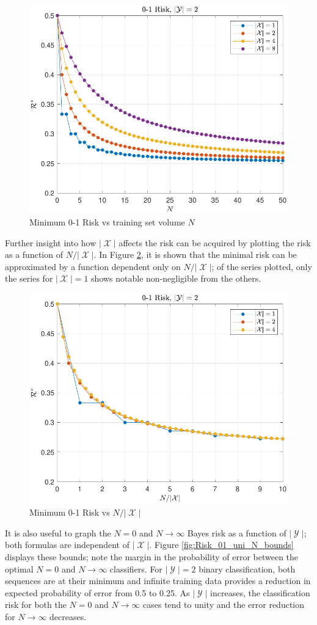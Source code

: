 \documentclass[12pt]{report}
\DeclareMathOperator{\Xcal}{\mathcal{X}}
\DeclareMathOperator{\Ycal}{\mathcal{Y}}
\begin{document}
\begin{figure}
\centering
\includegraphics[width=0.7\linewidth]{Risk_01_uni_N_leg_Mx.pdf}
\caption{Minimum 0-1 Risk vs training set volume $N$}
\label{fig:Risk_01_uni_N_leg_Mx}
\end{figure}

Further insight into how $|\Xcal|$ affects the risk can be acquired by plotting the risk as a function of $N/|\Xcal|$. In Figure \ref{fig:Risk_01_uni_N-Mx}, it is shown that the minimal risk can be approximated by a function dependent only on $N/|\Xcal|$; of the series plotted, only the series for $|\Xcal| = 1$ shows notable non-negligible from the others.

\begin{figure}
\centering
\includegraphics[width=0.7\linewidth]{Risk_01_uni_N-Mx.pdf}
\caption{Minimum 0-1 Risk vs $N/|\Xcal|$}
\label{fig:Risk_01_uni_N-Mx}
\end{figure}


It is also useful to graph the $N=0$ and $N \to \infty$ Bayes risk as a function of $|\Ycal|$; both formulas are independent of $|\Xcal|$. Figure \ref{fig:Risk_01_uni_N_bounds} displays these bounds; note the margin in the probability of error between the optimal $N=0$ and $N \to \infty$ classifiers. For $|\Ycal| = 2$ binary classification, both sequences are at their minimum and infinite training data provides a reduction in expected probability of error from 0.5 to 0.25. As $|\Ycal|$ increases, the classification risk for both the $N=0$ and $N \to \infty$ cases tend to unity and the error reduction for $N \to \infty$ decreases. 
\end{document}
